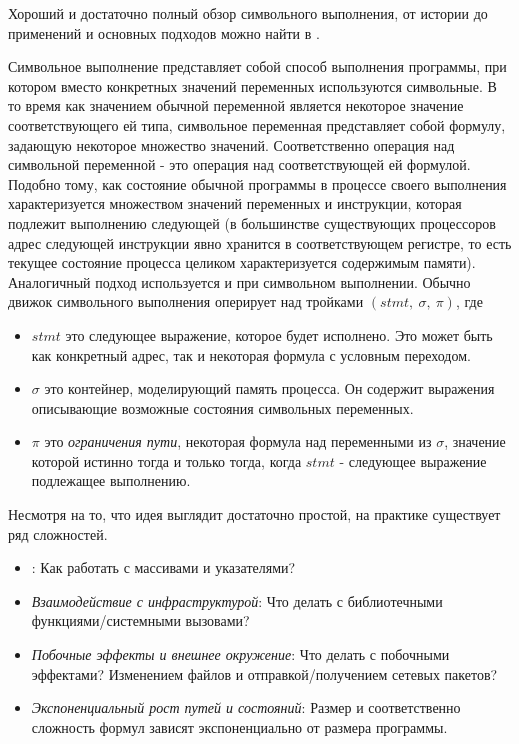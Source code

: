 Хороший и достаточно полный обзор символьного выполнения, от истории до применений и основных подходов можно найти в \cite{SurveySymExec-CSUR18}.

Символьное выполнение представляет собой способ выполнения программы, при котором вместо конкретных значений переменных используются символьные. В то время как значением обычной переменной является некоторое значение соответствующего ей типа, символьное переменная представляет собой формулу, задающую некоторое множество значений.
Соответственно операция над символьной переменной - это операция над соответствующей ей формулой.
\bigskip
Подобно тому, как состояние обычной программы в процессе своего выполнения характеризуется множеством значений переменных и инструкции, которая подлежит выполнению следующей (в большинстве существующих процессоров адрес следующей инструкции явно хранится в соответствующем регистре, то есть текущее состояние процесса целиком характеризуется содержимым памяти).
Аналогичный подход используется и при символьном выполнении.
Обычно движок символьного выполнения оперирует над тройками $(stmt,~\sigma,~\pi)$, где

\begin{itemize}
\item $stmt$ это следующее выражение, которое будет исполнено. Это может быть как конкретный адрес, так и некоторая формула с условным переходом.


\item $\sigma$ это контейнер, моделирующий память процесса. Он содержит выражения описывающие возможные состояния символьных переменных.

\item $\pi$ это {\em ограничения пути}, некоторая формула над переменными из $\sigma$, значение которой истинно тогда и только тогда, когда $stmt$ - следующее выражение подлежащее выполнению.

\end{itemize}

Несмотря на то, что идея выглядит достаточно простой, на практике существует ряд сложностей.

\begin{itemize}
\item {}: Как работать с массивами и указателями?

\item {\em Взаимодействие с инфраструктурой}: Что делать с библиотечными функциями/системными вызовами?

\item {\em Побочные эффекты и внешнее окружение}: Что делать с побочными эффектами? Изменением файлов и отправкой/получением сетевых пакетов?

\item {\em Экспоненциальный рост путей и состояний}: Размер и соответственно сложность формул зависят экспоненциально от размера программы.

\end{itemize}

